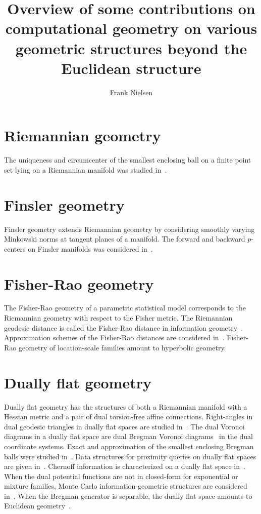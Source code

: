 \documentclass[11pt]{article}
\title{Overview of some contributions on computational geometry on various geometric structures beyond the Euclidean structure}
\author{Frank Nielsen}
\date{}
\begin{document}
\maketitle


\section*{Riemannian geometry}

The uniqueness and circumcenter of the smallest enclosing ball on a finite point set lying on a Riemannian manifold was studied in~\cite{arnaudon2013approximating}.

\section*{Finsler geometry}

Finsler geometry extends Riemannian geometry by considering smoothly varying Minkowski norms at tangent planes of a manifold.
The forward and backward $p$-centers on Finsler manifolds was considered in~\cite{arnaudon2012medians}.


\section*{Fisher-Rao geometry}

The Fisher-Rao geometry of a parametric statistical model corresponds to the Riemannian geometry with respect to the Fisher metric.
The Riemannian geodesic distance is called the Fisher-Rao distance in information geometry~\cite{nielsen2020elementary}.
Approximation schemes of the Fisher-Rao distances are considered in~\cite{nielsen2023simple,NIELSEN2024}.
Fisher-Rao geometry of location-scale families amount to hyperbolic geometry.


\section*{Dually flat geometry}

Dually flat geometry has the structures of both a Riemannian manifold with a Hessian metric and a pair of dual torsion-free affine connections.
Right-angles in dual geodesic triangles in dually flat spaces are studied in~\cite{nielsen2021geodesic}.
The dual Voronoi diagrams in a dually flat space are dual Bregman Voronoi diagrams~\cite{boissonnat2010bregman} in the dual coordinate systems.
Exact and approximation of the smallest enclosing Bregman balls were studied in~\cite{nock2005fitting,nielsen2008smallest}.
Data structures for proximity queries on dually flat spaces are given in~\cite{nielsen2009tailored,nielsen2009bregman}.
Chernoff information is characterized on a dually flat space in~\cite{nielsen2013information,nielsen2013hypothesis}.
When the dual potential functions are not in closed-form for exponential or mixture families, Monte Carlo information-geometric structures are considered in~\cite{nielsen2019monte}.
When the Bregman generator is separable, the dually flat space amounts to Euclidean geometry~\cite{gomes2018geometry}.
\end{document}

